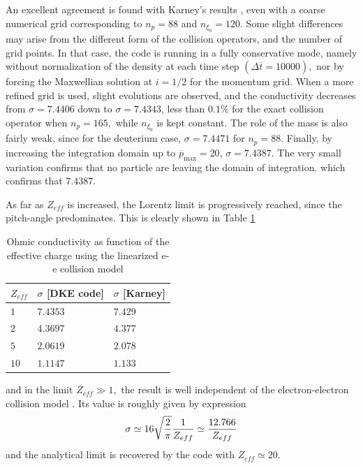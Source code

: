 An excellent agreement is found with Karney's results \cite{kar86}, even
with a coarse numerical grid corresponding to $n_{p}=88$ and $n_{\xi
_{0}}=120.$ Some slight differences may arise from the different form of the
collision operators, and the number of grid points. In that case, the code
is running in a fully conservative mode, namely without normalization of the
density at each time step $\left( \Delta \overline{t}=10000\right) ,$ nor by
forcing the Maxwellian solution at $i=1/2$ for the momentum grid. When a
more refined grid is used, slight evolutions are observed, and the
conductivity decreases from $\sigma =7.4406$ down to $\sigma =7.4343$, less
than $0.1\%$ for the exact collision operator when $n_{p}=165,$ while $%
n_{\xi _{0}}$ is kept constant. The role of the mass is also fairly weak,
since for the deuterium case, $\sigma =7.4471$ for $n_{p}=88.$ Finally, by
increasing the integration domain up to $\overline{p}_{\max }=20$, $\sigma
=7.4387.$ The very small variation confirms that no particle are leaving the
domain of integration. which confirms that $7.4387.$

As far as $Z_{eff}$ is increased, the Lorentz limit is progressively
reached, since the pitch-angle predominates. This is clearly shown in Table
\ref{Table_cond2}

\begin{table}[tbp]
\begin{center}
\begin{tabular}{|l|l|l|}
\hline
$Z_{eff}$ & $\sigma $ [DKE code] & $\sigma $ [Karney] \\ \hline
$1$ & $7.4353$ & $7.429$ \\ \hline
$2$ & $4.3697$ & $4.377$ \\ \hline
$5$ & $2.0619$ & $2.078$ \\ \hline
$10$ & $1.1147$ & $1.133$ \\ \hline
\end{tabular}
\end{center}
\caption{Ohmic conductivity as function of the effective charge using the
linearized e-e collision model}
\label{Table_cond2}
\end{table}

and in the limit $Z_{eff}\gg 1,$ the result is well independent of the
electron-electron collision model \cite{kar86}. Its value is roughly given
by expression
\begin{equation}
\sigma \simeq 16\sqrt{\frac{2}{\pi }}\frac{1}{Z_{eff}}\simeq \frac{12.766}{%
Z_{eff}}
\end{equation}
and the analytical limit is recovered by the code with $Z_{eff}\simeq 20.$

